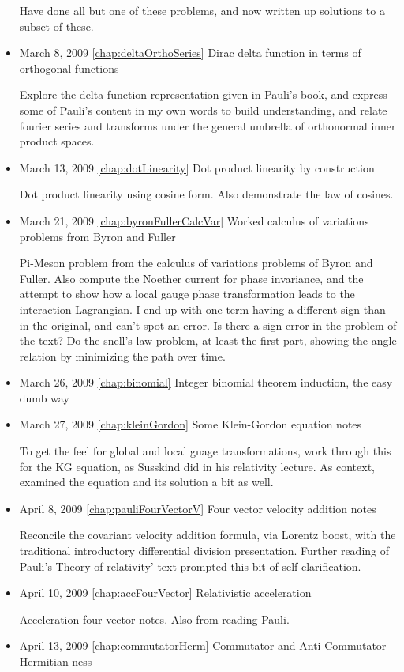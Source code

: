 \begin{itemize}
Have done all but one of these problems, and now written up solutions to a subset of these. \item March 8, 2009 \ref{chap:deltaOrthoSeries} Dirac delta function in terms of orthogonal functions

Explore the delta function representation given in Pauli's book, and express some of Pauli's content in my own words to build understanding, and relate fourier series and transforms under the general umbrella of orthonormal inner product spaces. \item March 13, 2009 \ref{chap:dotLinearity} Dot product linearity by construction

Dot product linearity using cosine form.  Also demonstrate the law of cosines.\item March 21, 2009 \ref{chap:byronFullerCalcVar} Worked calculus of variations problems from Byron and Fuller

Pi-Meson problem from the calculus of variations problems of Byron and Fuller.  Also compute the Noether current for phase invariance, and the attempt to show how a local gauge phase transformation leads to the interaction Lagrangian.  I end up with one term having a different sign than in the original, and can't spot an error.  Is there a sign error in the problem of the text?   Do the snell's law problem, at least the first part, showing the angle relation by minimizing the path over time.\item March 26, 2009 \ref{chap:binomial} Integer binomial theorem induction, the easy dumb way

\item March 27, 2009 \ref{chap:kleinGordon} Some Klein-Gordon equation notes

To get the feel for global and local guage transformations, work through this for the KG equation, as Susskind did in his relativity lecture.  As context, examined the equation and its solution a bit as well. \item April 8, 2009 \ref{chap:pauliFourVectorV} Four vector velocity addition notes

Reconcile the covariant velocity addition formula, via Lorentz boost, with the traditional introductory differential division presentation.  Further reading of Pauli's Theory of relativity' text prompted this bit of self clarification.\item April 10, 2009 \ref{chap:accFourVector} Relativistic acceleration

Acceleration four vector notes.  Also from reading Pauli.\item April 13, 2009 \ref{chap:commutatorHerm} Commutator and Anti-Commutator Hermitian-ness


\end{itemize}

